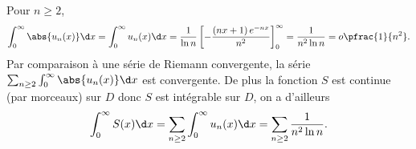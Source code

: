 \begin{enonce}
\begin{solution}
\begin{enumerate}
Pour $n\ge 2$,
\begin{equation*}
\int_0^\infty \abs{u_n(x)}\d x=
\int_0^\infty u_n(x)\d x=
\frac{1}{\ln n}\left[-\frac{\left( nx+1\right) e^{-nx}}{n^2}\right]_0^\infty
=\frac{1}{n^2\ln n}
=o\pfrac{1}{n^2}.
\end{equation*}
Par comparaison à une série de Riemann convergente, la série $\sum_{n\ge2}\int_0^\infty \abs{u_n(x)}\d x$ est  convergente. De plus la fonction $S$ est continue (par morceaux) sur $D$ donc $S$ est intégrable sur $D$, on a d'ailleurs
\begin{equation*}
\int_0^\infty S(x)\d x
= \sum_{n\ge2}\int_0^\infty u_n(x)\d x
= \sum_{n\ge2} \frac{1}{n^2\ln n}.
\end{equation*}
\end{enumerate}
\end{solution}
\end{enonce}
